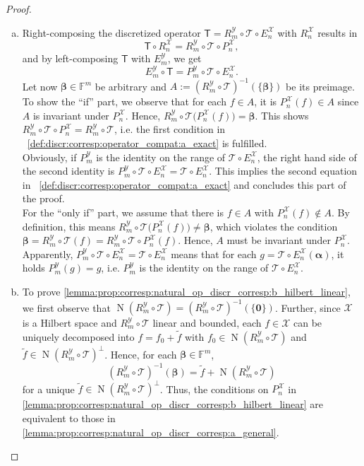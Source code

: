 \documentclass[a4paper]{paper}
\newcommand{\Spc}[1]{\mathscr{#1}}
\newcommand{\Field}{\mathbb{F}}
\newcommand{\Op}[1]{\mathcal{#1}}
\newcommand{\DiscOp}[1]{\mathsf{#1}}
\newcommand*{\EXT}[2]{\ensuremath{E_{#1}^{#2}}}
\newcommand*{\REST}[2]{\ensuremath{R_{#1}^{#2}}}
\newcommand*{\PROJ}[2]{\ensuremath{P_{#1}^{#2}}}
\newcommand*{\RnX}{\ensuremath{\REST{n}{\Spc{X}}}}
\newcommand*{\RmY}{\ensuremath{\REST{m}{\Spc{Y}}}}
\newcommand*{\EnX}{\ensuremath{\EXT{n}{\Spc{X}}}}
\newcommand*{\EmY}{\ensuremath{\EXT{m}{\Spc{Y}}}}
\newcommand*{\PnX}{\ensuremath{\PROJ{n}{\Spc{X}}}}
\newcommand*{\PmY}{\ensuremath{\PROJ{m}{\Spc{Y}}}}
\DeclareMathOperator{\nullspace}{N}
\newcommand{\vzero}{\boldsymbol{0}}
\newcommand{\valpha}{\boldsymbol{\alpha}}
\newcommand{\vbeta}{\boldsymbol{\beta}}
\begin{document}
\begin{proof}
 \begin{enumerate}[(a)]
  \item Right-composing the discretized operator $\DiscOp{T} = \RmY \circ \Op{T} \circ \EnX$ with $\RnX$ results in
  \begin{equation*}
   \DiscOp{T} \circ \RnX = \RmY \circ \Op{T} \circ \PnX,
  \end{equation*}
  and by left-composing $\DiscOp{T}$ with $\EmY$, we get
  \begin{equation*}
   \EmY \circ \DiscOp{T} = \PmY \circ \Op{T} \circ \EnX.
  \end{equation*}
  Let now $\vbeta \in \Field^m$ be arbitrary and $A := (\RmY \circ \Op{T})^{-1}(\{\vbeta\})$ be its preimage.
  To show the ``if'' part, we observe that for each $f \in A$, it is $\PnX(f) \in A$ since $A$ is invariant under 
  $\PnX$. Hence, $\RmY \circ \Op{T} \big( \PnX(f) \big) = \vbeta$. This shows 
  $\RmY \circ \Op{T} \circ \PnX = \RmY \circ \Op{T}$, i.e. the first condition 
  in ~\eqref{def:discr:corresp:operator_compat:a_exact} is fulfilled.\\
  Obviously, if $\PmY$ is the identity on the range of $\Op{T} \circ \EnX$, the right hand side of the second identity 
  is $\PmY \circ \Op{T} \circ \EnX = \Op{T} \circ \EnX$. This implies the second equation in 
  ~\eqref{def:discr:corresp:operator_compat:a_exact} and concludes this part of 
  the proof.\\
  For the ``only if'' part, we assume that there is $f \in A$ with $\PnX(f) \not\in A$. By definition, this means 
  $\RmY \circ \Op{T} \big( \PnX(f) \big) \neq \vbeta$, which violates the condition
  $\vbeta = \RmY \circ \Op{T} (f) = \RmY \circ \Op{T} \circ \PnX (f)$. Hence, $A$ must be invariant under $\PnX$.\\
  Apparently, $\PmY \circ \Op{T} \circ \EnX = \Op{T} \circ \EnX$ means that for each $g = \Op{T} \circ \EnX(\valpha)$, 
  it holds $\PmY(g) = g$, i.e. $\PmY$ is the identity on the range of $\Op{T} \circ \EnX$.

  \item To prove \eqref{lemma:prop:corresp:natural_op_discr_corresp:b_hilbert_linear}, we first observe that 
  $\nullspace(\RmY \circ \Op{T}) = (\RmY \circ \Op{T})^{-1}(\{\vzero\})$. Further, since $\Spc{X}$ is a Hilbert space 
  and $\RmY \circ \Op{T}$ linear and bounded, each $f \in \Spc{X}$ can be uniquely decomposed into 
  $f = f_0 + \tilde f$ with  $f_0 \in \nullspace(\RmY \circ \Op{T})$ and 
  $\tilde f \in \nullspace(\RmY \circ \Op{T})^\perp$. Hence, for each $\vbeta \in \Field^m$,
  \begin{equation*}
   (\RmY \circ \Op{T})^{-1}({\vbeta}) = \tilde f + \nullspace(\RmY \circ \Op{T})
  \end{equation*}
  for a unique $\tilde f \in \nullspace(\RmY \circ \Op{T})^\perp$. Thus, the conditions on $\PnX$ in 
  \eqref{lemma:prop:corresp:natural_op_discr_corresp:b_hilbert_linear} are equivalent to those in   
  \eqref{lemma:prop:corresp:natural_op_discr_corresp:a_general}.
  

\end{enumerate}
\end{proof}
\end{document}
